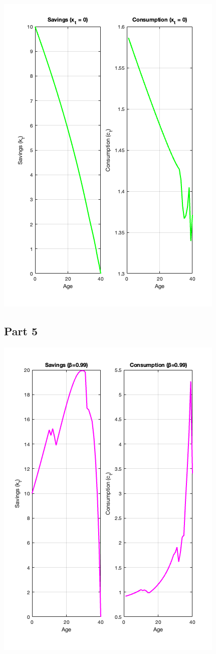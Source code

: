 \documentclass[10pt,a4paper]{article}
\begin{document}
\includegraphics[scale=0.5]{no_shock_lifecycle.png}

\subsection*{Part 5}

\includegraphics[scale=0.5]{high_beta_lifecycle.png}
\end{document}
